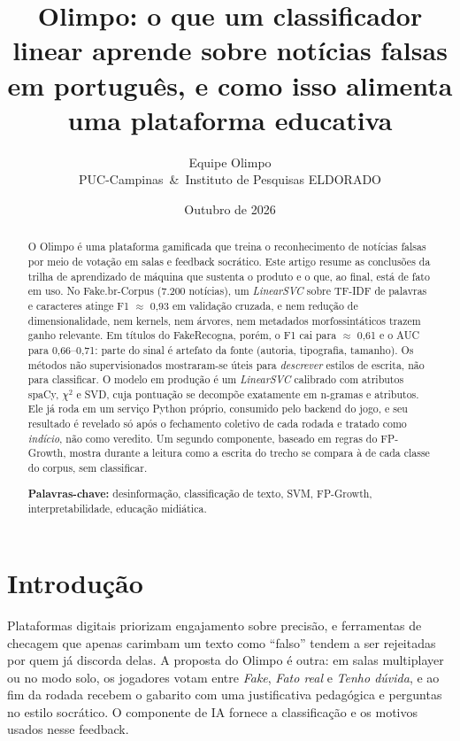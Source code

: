 \documentclass[brazilian,11pt,a4paper]{article}
\title{\textbf{Olimpo: o que um classificador linear aprende sobre notícias falsas em português, e como isso alimenta uma plataforma educativa}}
\author{Equipe Olimpo\\PUC-Campinas \,\&\, Instituto de Pesquisas ELDORADO}
\date{Outubro de 2026}
\begin{document}
\maketitle

\begin{abstract}
\noindent O Olimpo é uma plataforma gamificada que treina o reconhecimento de notícias falsas por meio de votação em salas e feedback socrático. Este artigo resume as conclusões da trilha de aprendizado de máquina que sustenta o produto e o que, ao final, está de fato em uso. No Fake.br-Corpus (7.200 notícias), um \textit{LinearSVC} sobre TF-IDF de palavras e caracteres atinge F1 $\approx$ 0,93 em validação cruzada, e nem redução de dimensionalidade, nem kernels, nem árvores, nem metadados morfossintáticos trazem ganho relevante. Em títulos do FakeRecogna, porém, o F1 cai para $\approx$ 0,61 e o AUC para 0,66--0,71: parte do sinal é artefato da fonte (autoria, tipografia, tamanho). Os métodos não supervisionados mostraram-se úteis para \emph{descrever} estilos de escrita, não para classificar. O modelo em produção é um \textit{LinearSVC} calibrado com atributos spaCy, $\chi^2$ e SVD, cuja pontuação se decompõe exatamente em n-gramas e atributos. Ele já roda em um serviço Python próprio, consumido pelo backend do jogo, e seu resultado é revelado só após o fechamento coletivo de cada rodada e tratado como \emph{indício}, não como veredito. Um segundo componente, baseado em regras do FP-Growth, mostra durante a leitura como a escrita do trecho se compara à de cada classe do corpus, sem classificar.

\medskip
\noindent\textbf{Palavras-chave:} desinformação, classificação de texto, SVM, FP-Growth, interpretabilidade, educação midiática.
\end{abstract}

\section{Introdução}

Plataformas digitais priorizam engajamento sobre precisão, e ferramentas de checagem que apenas carimbam um texto como ``falso'' tendem a ser rejeitadas por quem já discorda delas. A proposta do Olimpo é outra: em salas multiplayer ou no modo solo, os jogadores votam entre \emph{Fake}, \emph{Fato real} e \emph{Tenho dúvida}, e ao fim da rodada recebem o gabarito com uma justificativa pedagógica e perguntas no estilo socrático. O componente de IA fornece a classificação e os motivos usados nesse feedback.
\end{document}
